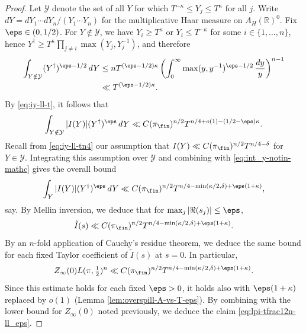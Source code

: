 \begin{proof}
  Let $\mathcal{Y}$ denote the set of all $Y$ for which $T^{-\kappa} \leq Y_j \leq T^{\kappa}$ for all $j$.  Write $d Y = d Y_1 \dotsb d Y_n /(Y_1 \dotsb Y_n)$ for the multiplicative Haar measure on $A_H(\mathbb{R})^0$.  Fix $\eps \in (0,1/2)$.  For $Y \notin \mathcal{Y}$, we have $Y_i \geq T^\kappa$ or $Y_i \leq T^{-\kappa}$ for some $i \in \{1, \dotsc, n\}$, hence $Y^\dagger \geq T^{\kappa} \prod_{j \neq i} \max(Y_j, Y_j^{-1})$, and therefore
  \begin{align*}
    \int_{Y \notin \mathcal{Y} } (Y^\dagger)^{\eps - 1/2} \, d Y
    &\leq
      n T^{(\eps - 1/2) \kappa} \left(
      \int_0^\infty
      \max(y, y^{-1})^{\eps - 1/2}
      \, \frac{d y}{y}
      \right)^{n - 1}
    \\
    &\ll T^{(\eps - 1/2) \kappa}.
  \end{align*}
  By \eqref{eq:iy-ll-t}, it follows that
  \begin{equation}\label{eq:int_y-notin-mathc}
    \int_{Y \notin \mathcal{Y} }
    |I(Y)| (Y^\dagger )^{\eps} \, d Y
    \ll
    C(\pi_{\fin})^{n/2}
    T^{n/4  + o(1) - (1/2-\eps) \kappa}.
  \end{equation}
  Recall from \eqref{eq:iy-ll-tn4} our assumption that $I(Y) \ll C(\pi_{\fin})^{n/2} T^{n/4 - \delta}$ for $Y \in \mathcal{Y}$.  Integrating this assumption over $\mathcal{Y}$ and combining with \eqref{eq:int_y-notin-mathc} gives the overall bound
  \begin{equation}
    \int_{Y} |I(Y)| (Y^\dagger )^\eps  \, d Y
    \ll
    C(\pi_{\fin})^{n/2}
    T^{n/4  - \min(\kappa/2,\delta)  + \eps (1 + \kappa) },
  \end{equation}
  say.  By Mellin inversion, we deduce that
  for
  $\max_j
  |\Re(s_j)| \leq \eps$,
  \begin{equation*}
    \tilde{I}(s)
    \ll
    C(\pi_{\fin})^{n/2}
    T^{n/4  - \min(\kappa/2,\delta)  + \eps (1 + \kappa) }.
  \end{equation*}
  By an $n$-fold application of Cauchy's residue theorem, we deduce the same bound for each fixed Taylor coefficient of $\tilde{I}(s)$ at $s=0$.  In particular,
  \begin{equation}
    Z_\infty(0)
    L(\pi,\tfrac{1}{2})^n \ll
    C(\pi_{\fin})^{n/2}
    T^{n/4  - \min(\kappa/2,\delta) + \eps (1 + \kappa) }.
  \end{equation}
  Since this estimate holds for each fixed $\eps > 0$, it holds also with $\eps (1 + \kappa)$ replaced by $o(1)$ (Lemma \ref{lem:overspill-A-vs-T-eps}).  By combining with the lower bound for $Z_\infty(0)$ noted previously, we deduce the claim \eqref{eq:lpi-tfrac12n-ll_eps}.
\end{proof}


